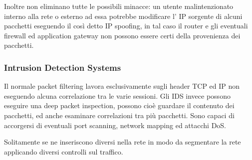 Inoltre non eliminano tutte le possibili minacce: un utente malintenzionato interno alla rete o esterno ad essa potrebbe modificare l' IP sorgente di alcuni pacchetti eseguendo il così detto IP spoofing, in tal caso il router e gli eventuali firewall ed application gateway non possono essere certi della provenienza dei pacchetti.

\subsubsection{Intrusion Detection Systems}
Il normale packet filtering lavora esclusivamente sugli header TCP ed IP non eseguendo alcuna correlazione tra le varie sessioni.
Gli IDS invece possono eseguire una deep packet inspection, possono cioè guardare il contenuto dei pacchetti, ed anche esaminare correlazioni tra più pacchetti.
Sono capaci di accorgersi di eventuali port scanning, network mapping ed attacchi DoS.

Solitamente se ne inseriscono diversi nella rete in modo da segmentare la rete applicando diversi controlli sul traffico.

